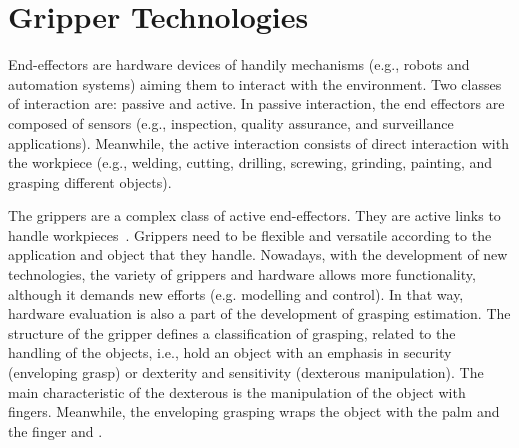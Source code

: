 \section{Gripper Technologies}
\label{sec:grippers_technolgy}

End-effectors are hardware devices of handily mechanisms (e.g., robots and automation
systems) aiming them to interact with the environment. Two classes of interaction are:
passive and active. In passive interaction, the end effectors are composed of sensors (e.g., inspection, quality assurance, and surveillance applications). Meanwhile, the active interaction consists of direct interaction with the workpiece (e.g., welding, cutting, drilling, screwing, grinding, painting, and grasping different objects).

\begin{figure}[h!]
\end{figure}

The grippers are a complex class of active end-effectors. They are active links to handle workpieces~\cite{monkman2007robot}. Grippers need to be flexible and versatile according to the application and object that they handle. Nowadays, with the development of new technologies, the variety of grippers and hardware allows more functionality, although it demands new efforts (e.g. modelling and control). In that way, hardware evaluation is also a part of the development of grasping estimation. The structure of the gripper defines a classification of grasping, related to the handling of the objects, i.e., hold an object with an emphasis in security (enveloping grasp) or dexterity and sensitivity (dexterous manipulation). The main characteristic of the dexterous is the manipulation of the object with fingers. Meanwhile, the enveloping grasping wraps the object with the palm and the finger \cite{Bicchi2000} and \cite{alonso2018current}.


